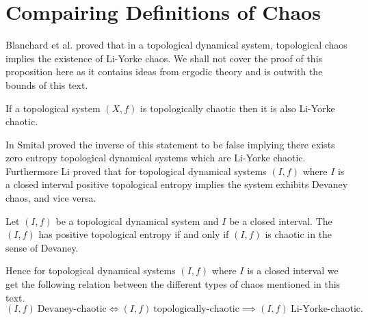 \section{Compairing Definitions of Chaos} \label{sec:compairing-chaos}

Blanchard et al. \cite{bgsm} proved that in a topological dynamical system, topological chaos implies the existence of Li-Yorke chaos. We shall not cover the proof of this proposition here as it contains ideas from ergodic theory and is outwith the bounds of this text.

\begin{prop}
    If a topological system $(X, f)$ is topologically chaotic then it is also Li-Yorke chaotic.
\end{prop}

In \cite{smital} Smital proved the inverse of this statement to be false implying there exists zero entropy topological dynamical systems which are Li-Yorke chaotic. Furthermore Li \cite{li} proved that for topological dynamical systems $(I, f)$ where $I$ is a closed interval positive topological entropy implies the system exhibits Devaney chaos, and vice versa.

\begin{prop}
    Let $(I, f)$ be a topological dynamical system and $I$ be a closed interval. The $(I, f)$ has positive topological entropy if and only if $(I, f)$ is chaotic in the sense of Devaney.
\end{prop}

Hence for topological dynamical systems $(I, f)$ where $I$ is a closed interval we get the following relation between the different types of chaos mentioned in this text. \[(I, f)\ \text{Devaney-chaotic} \iff (I, f)\ \text{topologically-chaotic} \implies (I, f)\ \text{Li-Yorke-chaotic}.\]